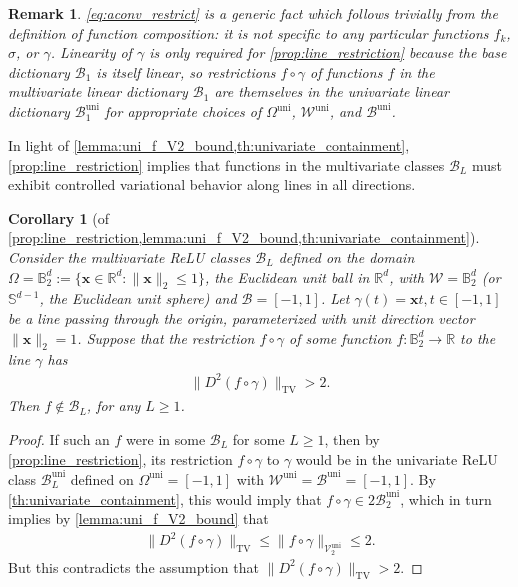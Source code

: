 \documentclass{article}
\DeclareMathOperator{\TV}{TV}
\def\vx{{\bm{x}}}
\def\cB{{\mathcal{B}}}
\def\cV{{\mathcal{V}}}
\def\cW{{\mathcal{W}}}
\def\bB{{\mathbb{B}}}
\def\bS{{\mathbb{S}}}
\newcommand{\R}{\mathbb{R}}
\newtheorem{corollary}[theorem]{Corollary}
\newtheorem{remark}[theorem]{Remark}
\begin{document}
\begin{remark}
    \eqref{eq:aconv_restrict} is a generic fact which follows trivially from the definition of function composition: it is not specific to any particular functions $f_k$, $\sigma$, or $\gamma$. Linearity of $\gamma$ is only required for \cref{prop:line_restriction} because the base dictionary $\cB_1$ is itself linear, so restrictions $f \circ \gamma$ of functions $f$ in the multivariate linear dictionary $\cB_1$ are themselves in the univariate linear dictionary $\cB_1^{\textrm{uni}}$ for appropriate choices of $\Omega^{\textrm{uni}}$, $\cW^{\textrm{uni}}$, and $\cB^{\textrm{uni}}$. 
\end{remark}

In light of \cref{lemma:uni_f_V2_bound,th:univariate_containment}, \cref{prop:line_restriction} implies that functions in the multivariate classes $\cB_L$ must exhibit controlled variational behavior along lines in all directions.

\begin{corollary}[of \cref{prop:line_restriction,lemma:uni_f_V2_bound,th:univariate_containment}] \label{corr:line_restriction_TV2}
    Consider the multivariate ReLU classes $\cB_L$ defined on the domain $\Omega = \bB_2^d := \{ \vx \in \R^d: \| \vx \|_2 \leq 1 \}$, the Euclidean unit ball in $\R^d$, with $\cW = \bB_2^d$ (or $\bS^{d-1}$, the Euclidean unit sphere) and $\cB = [-1,1]$. Let $\gamma(t) = \vx t, t \in [-1,1]$ be a line passing through the origin, parameterized with unit direction vector $\| \vx \|_2 = 1$. Suppose that the restriction $f \circ \gamma$ of some function $f: \bB_2^d \to \R$ to the line $\gamma$ has
    \begin{align} \label{eq:D2f_gamma_TV2_bound}
        \| D^2 (f \circ \gamma) \|_{\TV} > 2.
    \end{align}
    Then $f \notin \cB_L$, for any $L \geq 1$.
\end{corollary}
\begin{proof}
    If such an $f$ were in some $\cB_L$ for some $L \geq 1$, then by \cref{prop:line_restriction}, its restriction $f \circ \gamma$ to $\gamma$ would be in the univariate ReLU class $\cB_L^{\mathrm{uni}}$ defined on $\Omega^\mathrm{uni} = [-1,1]$ with $\cW^\mathrm{uni} = \cB^\mathrm{uni} = [-1,1]$. By \cref{th:univariate_containment}, this would imply that $f \circ \gamma \in 2 \cB_2^{\mathrm{uni}}$, which in turn implies by \cref{lemma:uni_f_V2_bound} that
    \begin{align}
        \| D^2 (f \circ \gamma) \|_{\TV} \leq \| f \circ \gamma \|_{\cV_2^{\mathrm{uni}}} \leq 2.
    \end{align}
    But this contradicts the assumption that $\| D^2 (f \circ \gamma) \|_{\TV} > 2$.
\end{proof}
\end{document}
